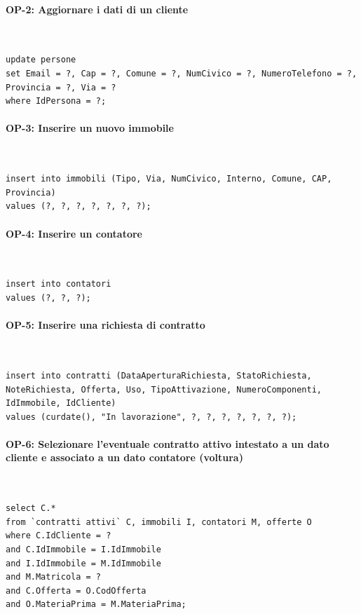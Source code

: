 \documentclass[a4paper,12pt]{report}
\begin{document}
\paragraph{OP-2: Aggiornare i dati di un cliente}\mbox{}\\
\begin{lstlisting}
update persone
set Email = ?, Cap = ?, Comune = ?, NumCivico = ?, NumeroTelefono = ?, Provincia = ?, Via = ?
where IdPersona = ?;
\end{lstlisting}
    
\paragraph{OP-3: Inserire un nuovo immobile}\mbox{}\\
\begin{lstlisting}
insert into immobili (Tipo, Via, NumCivico, Interno, Comune, CAP, Provincia)
values (?, ?, ?, ?, ?, ?, ?);
\end{lstlisting}
    
\paragraph{OP-4: Inserire un contatore}\mbox{}\\
\begin{lstlisting}
insert into contatori
values (?, ?, ?);
\end{lstlisting}

\paragraph{OP-5: Inserire una richiesta di contratto}\mbox{}\\
\begin{lstlisting}
insert into contratti (DataAperturaRichiesta, StatoRichiesta, NoteRichiesta, Offerta, Uso, TipoAttivazione, NumeroComponenti, IdImmobile, IdCliente)
values (curdate(), "In lavorazione", ?, ?, ?, ?, ?, ?, ?);
\end{lstlisting}

\paragraph{OP-6: Selezionare l'eventuale contratto attivo intestato a un dato cliente e associato a un dato contatore (voltura)}\mbox{}\\
\begin{lstlisting}
select C.*
from `contratti attivi` C, immobili I, contatori M, offerte O
where C.IdCliente = ?
and C.IdImmobile = I.IdImmobile
and I.IdImmobile = M.IdImmobile
and M.Matricola = ?
and C.Offerta = O.CodOfferta
and O.MateriaPrima = M.MateriaPrima;
\end{lstlisting}
\end{document}
